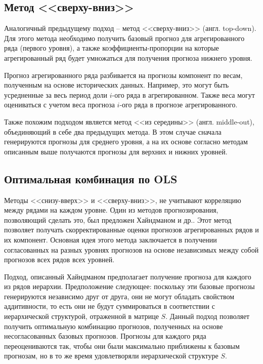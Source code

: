 \documentclass[12pt,a4paper, oneside]{extreport}
\begin{document}
\subsection{Метод <<сверху-вниз>>}

Аналогичный предыдущему подход --  метод <<сверху-вниз>> (англ. top-down). Для этого метода необходимо получить базовый прогноз для агрегированного ряда (первого уровня), а также коэффициенты-пропорции на которые агрегированный ряд будет умножаться для получения прогноза нижнего уровня.   



Прогноз   агрегированного  ряда разбивается на прогнозы компонент по весам, полученным  на основе исторических данных. Например,  это могут быть усредненные  за весь период доли  $i$-ого  ряда в агрегированном. 
Также веса могут  оцениваться  с учетом веса прогноза $i$-ого  ряда в прогнозе  агрегированного. 

Также похожим  подходом является метод <<из середины>>  (англ. middle-out), объединяющий в себе два предыдущих метода. В этом случае сначала генерируются прогнозы для среднего уровня, а на их основе согласно методам описанным выше получаются прогнозы для верхних и нижних уровней. 


\subsection{Оптимальная комбинация по OLS  }


Методы  <<снизу-вверх>> и <<сверху-вниз>>,  не учитывают  корреляцию между  рядами на каждом уровне.  
Один из методов прогнозирования, позволяющий сделать это, был предложен Хайндманом и др.\cite{hyndman2011optimal}. 
Этот метод позволяет получать скорректированные  оценки  прогнозов агрегированных рядов и их компонент. Основная идея этого метода заключается в получении согласованных  на разных уровнях прогнозов на основе независимых между собой прогнозов всех рядов всех уровней. 


Подход, описанный Хайндманом\cite{hyndman2016fast} предполагает получение прогноза для  каждого из рядов иерархии. Предположение следующее: поскольку эти базовые прогнозы генерируются независимо друг от друга,  они не могут обладать свойством аддитивности, то есть они не  будут суммироваться в соответствии с иерархической структурой, отраженной в матрице $S$. Данный подход позволяет получить оптимальную комбинацию прогнозов, полученных на основе несогласованных базовых прогнозов.  Прогнозы для каждого ряда переоцениваются так, чтобы они были максимально приближены к базовым прогнозам, но в то же время удовлетворяли   иерархической структуре $S$. 
\end{document}
